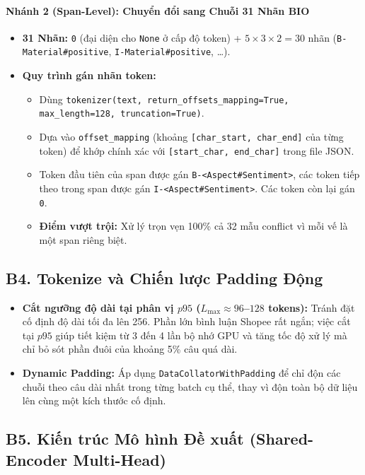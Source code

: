\documentclass[11pt,a4paper]{article}
\begin{document}
\paragraph{Nhánh 2 (Span-Level): Chuyển đổi sang Chuỗi 31 Nhãn BIO}
\begin{itemize}
    \item \textbf{31 Nhãn:} \texttt{0} (đại diện cho \texttt{None} ở cấp độ token) + $5 \times 3 \times 2 = 30$ nhãn (\texttt{B-Material\#positive}, \texttt{I-Material\#positive}, \dots).
    \item \textbf{Quy trình gán nhãn token:}
    \begin{itemize}
        \item Dùng \texttt{tokenizer(text, return\_offsets\_mapping=True, max\_length=128, truncation=True)}.
        \item Dựa vào \texttt{offset\_mapping} (khoảng \texttt{[char\_start, char\_end]} của từng token) để khớp chính xác với \texttt{[start\_char, end\_char]} trong file JSON.
        \item Token đầu tiên của span được gán \texttt{B-<Aspect\#Sentiment>}, các token tiếp theo trong span được gán \texttt{I-<Aspect\#Sentiment>}. Các token còn lại gán \texttt{0}.
        \item \textbf{Điểm vượt trội:} Xử lý trọn vẹn 100\% cả 32 mẫu conflict vì mỗi vế là một span riêng biệt.
    \end{itemize}
\end{itemize}

\subsection*{B4. Tokenize và Chiến lược Padding Động}
\begin{itemize}
    \item \textbf{Cắt ngưỡng độ dài tại phân vị $p95$ ($L_{\max} \approx 96$--$128$ tokens):} Tránh đặt cố định độ dài tối đa lên 256. Phần lớn bình luận Shopee rất ngắn; việc cắt tại $p95$ giúp tiết kiệm từ 3 đến 4 lần bộ nhớ GPU và tăng tốc độ xử lý mà chỉ bỏ sót phần đuôi của khoảng 5\% câu quá dài.
    \item \textbf{Dynamic Padding:} Áp dụng \texttt{DataCollatorWithPadding} để chỉ độn các chuỗi theo câu dài nhất trong từng batch cụ thể, thay vì độn toàn bộ dữ liệu lên cùng một kích thước cố định.
\end{itemize}

\subsection*{B5. Kiến trúc Mô hình Đề xuất (Shared-Encoder Multi-Head)}
\end{document}
